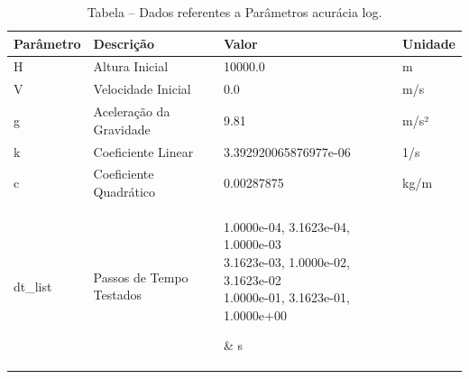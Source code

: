 \begin{table}[H]
\centering
\caption{Tabela – Dados referentes a Parâmetros acurácia log.}
\label{tab:parametros_acuracia_log}
\begin{tabular}{l l p{6cm} l}
\toprule
Parâmetro & Descrição & Valor & Unidade \\
\midrule
H & Altura Inicial & 10000.0 & m \\
V & Velocidade Inicial & 0.0 & m/s \\
g & Aceleração da Gravidade & 9.81 & m/s² \\
k & Coeficiente Linear & 3.392920065876977e-06 & 1/s \\
c & Coeficiente Quadrático & 0.00287875 & kg/m \\
dt\_list & Passos de Tempo Testados &
\parbox{6cm}{\scriptsize
1.0000e-04, 3.1623e-04, 1.0000e-03 \\
3.1623e-03, 1.0000e-02, 3.1623e-02 \\
1.0000e-01, 3.1623e-01, 1.0000e+00
}
& s \\
\bottomrule
\end{tabular}
\end{table}